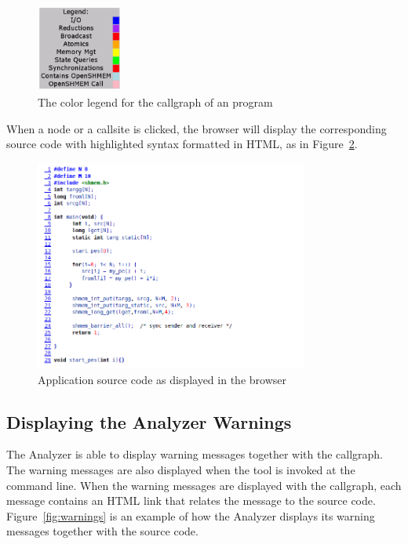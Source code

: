 \begin{figure}[!ht]
  \begin{center}
    \includegraphics[width=0.25\textwidth]{./osa_color_legend}
    \caption{The color legend for the callgraph of an \openshmem program}
    \label{fig:colors}
  \end{center}
\end{figure}

When a node or a callsite is clicked, the browser will display the
corresponding source code with highlighted syntax formatted in HTML, as
in Figure~\ref{fig:app-source}.

\vspace{0.1in}

\begin{figure}[!ht]
  \begin{center}
    \includegraphics[width=0.8\textwidth]{./source_listing_test_bounds}
    \caption{Application source code as displayed in the browser}
    \label{fig:app-source}
  \end{center}
\end{figure}

\subsection{Displaying the \openshmem Analyzer Warnings}

The \openshmem Analyzer is able to display \openshmem warning messages
together with the callgraph. The warning messages are also displayed
when the tool is invoked at the command line. When the warning messages
are displayed with the callgraph, each message contains an HTML link
that relates the message to the source code. Figure~\ref{fig:warnings} is
an example of how the \openshmem Analyzer displays its warning messages
together with the source code.

